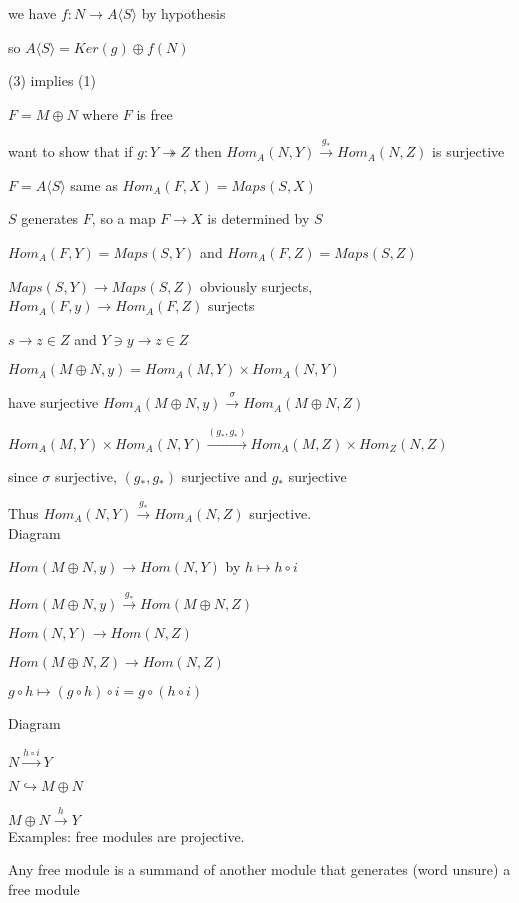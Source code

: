 \documentclass[12pt]{article}
\begin{document}
we have $f: N \to A\langle S\rangle$ by hypothesis

so $A\langle S\rangle = Ker(g) \oplus f(N)$

\noindent
(3) implies (1)

$F = M \oplus N$ where $F$ is free

want to show that if $g: Y \twoheadrightarrow Z$ then $Hom_A(N, Y) \xrightarrow{g_*} Hom_A(N, Z)$ is surjective

$F = A\langle S \rangle$ same as $Hom_A(F, X) = Maps(S, X)$

$S$ generates $F$, so a map $F \to X$ is determined by $S$

$Hom_A(F, Y) = Maps(S, Y)$ and $Hom_A(F, Z) = Maps(S, Z)$

$Maps(S, Y) \to Maps(S, Z)$ obviously surjects, $Hom_A(F, y) \to Hom_A(F, Z)$ surjects

$s \to z \in Z$ and $Y \ni y \to z \in Z$

$Hom_A(M \oplus N, y) = Hom_A(M, Y) \times Hom_A(N, Y)$

have surjective $Hom_A(M \oplus N, y) \xrightarrow{\sigma} Hom_A(M \oplus N, Z)$

$Hom_A(M, Y) \times Hom_A(N, Y) \xrightarrow{(g_*, g_*)} Hom_A(M, Z) \times Hom_Z(N, Z)$

since $\sigma$ surjective, $(g_*, g_*)$ surjective and $g_*$ surjective

Thus $Hom_A(N, Y) \xrightarrow{g_*} Hom_A(N, Z)$ surjective.\\

\noindent
Diagram

$Hom(M \oplus N, y) \to Hom(N, Y)$ by $h \mapsto h \circ i$

$Hom(M \oplus N, y) \xrightarrow{g_*} Hom(M \oplus N, Z)$

$Hom(N, Y) \to Hom(N, Z)$

$Hom(M \oplus N, Z) \to Hom(N, Z)$

$g \circ h \mapsto (g \circ h) \circ i = g \circ (h \circ i)$

\noindent
Diagram

$N \xrightarrow{h \circ i} Y$

$N \hookrightarrow M \oplus N$

$M \oplus N \xrightarrow{h} Y$\\

\noindent
Examples: free modules are projective.

Any free module is a summand of another module that generates (word unsure) a free module
\end{document}

